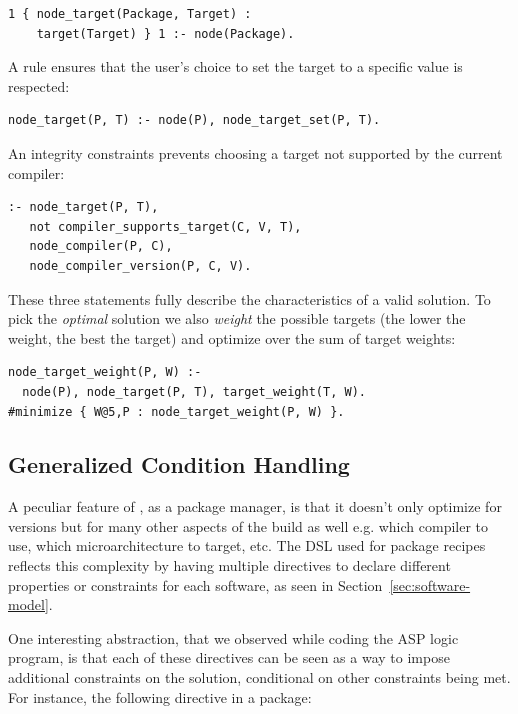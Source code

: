 \begin{verbatim}
1 { node_target(Package, Target) :
    target(Target) } 1 :- node(Package).
\end{verbatim}

A rule ensures that the user's choice to set the target to a specific value is respected:

\begin{verbatim}
node_target(P, T) :- node(P), node_target_set(P, T).
\end{verbatim}

An integrity constraints prevents choosing a target not supported by the current compiler:

\begin{verbatim}
:- node_target(P, T),
   not compiler_supports_target(C, V, T),
   node_compiler(P, C),
   node_compiler_version(P, C, V).
\end{verbatim}

These three statements fully describe the characteristics of a valid solution. To pick the \emph{optimal} solution we also \emph{weight} the possible targets
(the lower the weight, the best the target) and optimize over the sum of target weights:

\begin{verbatim}
node_target_weight(P, W) :-
  node(P), node_target(P, T), target_weight(T, W).
#minimize { W@5,P : node_target_weight(P, W) }.
\end{verbatim}

\subsection{Generalized Condition Handling}
\label{subsec:generalizedcond}
A peculiar feature of \spack, as a package manager, is that it doesn't only optimize for versions but for many other aspects of the build as well e.g. which compiler to use, which microarchitecture to target, etc.
The DSL used for package recipes reflects this complexity by having multiple directives to declare different properties or constraints for each software, as seen in Section~\ref{sec:software-model}.

One interesting abstraction, that we observed while coding the ASP logic program, is that each of these directives can be seen as a way to impose additional constraints on the solution, conditional on other constraints
being met. For instance, the following directive in a package:

